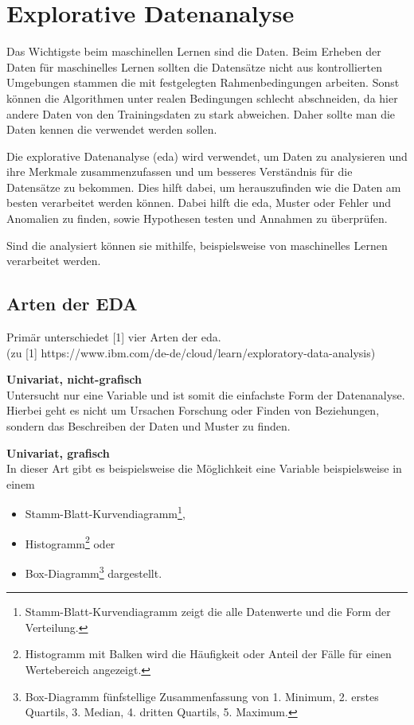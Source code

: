 \chapter{Explorative Datenanalyse}
Das Wichtigste beim maschinellen Lernen sind die Daten. Beim Erheben der Daten für maschinelles Lernen sollten die Datensätze nicht aus kontrollierten Umgebungen stammen die mit festgelegten Rahmenbedingungen arbeiten. Sonst können die Algorithmen unter realen Bedingungen schlecht abschneiden, da hier andere Daten von den Trainingsdaten zu stark abweichen. Daher sollte man die Daten kennen die verwendet werden sollen.\vspace{0.2cm}

Die explorative Datenanalyse (\Gls{eda}) wird verwendet, um Daten zu analysieren und ihre Merkmale zusammenzufassen und um besseres Verständnis für die Datensätze zu bekommen. Dies hilft dabei, um herauszufinden wie die Daten am besten verarbeitet werden können. Dabei hilft die \Gls{eda}, Muster oder Fehler und Anomalien zu finden, sowie Hypothesen testen und Annahmen zu überprüfen.\vspace{0.2cm}

Sind die analysiert können sie mithilfe, beispielsweise von maschinelles Lernen verarbeitet werden.

\section{Arten der EDA}
Primär unterschiedet [1] vier Arten der \Gls{eda}.\\(zu [1] https://www.ibm.com/de-de/cloud/learn/exploratory-data-analysis)\vspace{0.2cm}

\textbf{Univariat, nicht-grafisch}\\
Untersucht nur eine Variable und ist somit die einfachste Form der Datenanalyse. Hierbei geht es nicht um Ursachen Forschung oder Finden von Beziehungen, sondern das Beschreiben der Daten und Muster zu finden.\vspace{0.2cm}

\textbf{Univariat, grafisch}\\
In dieser Art gibt es beispielsweise die Möglichkeit eine Variable beispielsweise in einem
\begin{itemize}
	\item Stamm-Blatt-Kurvendiagramm\footnote{Stamm-Blatt-Kurvendiagramm zeigt die alle Datenwerte und die Form der Verteilung.},
	\item Histogramm\footnote{Histogramm mit Balken wird die Häufigkeit oder Anteil der Fälle für einen Wertebereich angezeigt.} oder
	\item Box-Diagramm\footnote{Box-Diagramm fünfstellige Zusammenfassung von 1. Minimum, 2. erstes Quartils, 3. Median, 4. dritten Quartils, 5. Maximum.} dargestellt.
\end{itemize}


